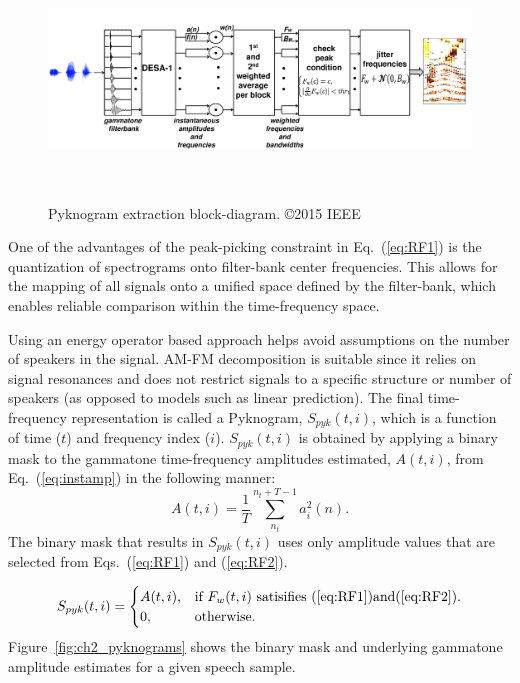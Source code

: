 {\begin{figure}[h!]
	\centering
	\vspace{0mm}
	\includegraphics[height = 2.5in, width=1\textwidth]{figures/pyknogram_blockdiagram}
	\vspace{-3mm}
	\caption{ Pyknogram extraction block-diagram. \copyright 2015 IEEE}
	\label{fig:ch2_pykno_blockdiag}
	\vspace{-3mm}
\end{figure}


One of the advantages of the peak-picking constraint in Eq.~(\ref{eq:RF1}) is the quantization of spectrograms onto filter-bank center frequencies. 
This allows for the mapping of all signals onto a unified space defined by the filter-bank, which enables reliable comparison within the time-frequency space. 

Using an energy operator based approach helps avoid assumptions on the number of speakers in the signal. 
AM-FM decomposition is suitable since it relies on signal resonances and does not restrict signals to a specific structure or number of speakers (as opposed to models such as linear prediction). 
The final time-frequency representation is called a Pyknogram, $S_{pyk}(t,i)$, which is a function of time ($t$) and frequency index ($i$). 
$S_{pyk}(t,i)$ is obtained by applying a binary mask to the gammatone time-frequency amplitudes estimated, $A(t,i)$, from Eq.~(\ref{eq:instamp}) in the following manner:
\begin{equation}
\label{eq:amplitude_spectrum}
A(t,i) = \frac{1}{T}\sum_{n_t}^{n_t+T - 1}a_i^2(n).
\end{equation}
The binary mask that results in $S_{pyk}(t,i)$ uses only amplitude values that are selected from Eqs.~(\ref{eq:RF1}) and (\ref{eq:RF2}). 


\begin{equation}
S_{pyk}(t,i)=\begin{cases}
A(t,i), & \text{if $F_w(t,i)$ satisifies (\ref{eq:RF1})and(\ref{eq:RF2})}.\\
0, & \text{otherwise}.
\end{cases}
\end{equation}
Figure~\ref{fig:ch2_pyknograms} shows the binary mask and underlying gammatone amplitude estimates for a given speech sample. 

}
